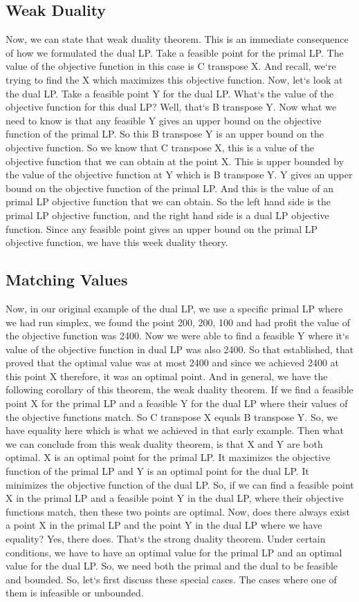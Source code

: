 \subsection{Weak Duality}
Now, we can state that weak duality theorem.
This is an immediate consequence of how we formulated the dual LP\@.
Take a feasible point for the primal LP\@.
The value of the objective function in this case is C transpose X\@.
And recall, we`re trying to find the X which maximizes this objective function.
Now, let`s look at the dual LP\@.
Take a feasible point Y for the dual LP\@.
What`s the value of the objective function for this dual LP? Well, that`s B transpose Y\@.
Now what we need to know is that any feasible Y gives an upper bound on the objective function of the primal LP\@.
So this B transpose Y is an upper bound on the objective function.
So we know that C transpose X, this is a value of the objective function that we can obtain at the point X\@.
This is upper bounded by the value of the objective function at Y which is B transpose Y\@.
Y gives an upper bound on the objective function of the primal LP\@.
And this is the value of an primal LP objective function that we can obtain.
So the left hand side is the primal LP objective function, and the right hand side is a dual LP objective function.
Since any feasible point gives an upper bound on the primal LP objective function, we have this week duality theory.

\subsection{Matching Values}
Now, in our original example of the dual LP, we use a specific primal LP where we had run simplex, we found the point 200, 200, 100 and had profit the value of the objective function was 2400.
Now we were able to find a feasible Y where it`s value of the objective function in dual LP was also 2400.
So that established, that proved that the optimal value was at most 2400 and since we achieved 2400 at this point X therefore, it was an optimal point.
And in general, we have the following corollary of this theorem, the weak duality theorem.
If we find a feasible point X for the primal LP and a feasible Y for the dual LP where their values of the objective functions match.
So C transpose X equals B transpose Y\@.
So, we have equality here which is what we achieved in that early example.
Then what we can conclude from this weak duality theorem, is that X and Y are both optimal.
X is an optimal point for the primal LP\@.
It maximizes the objective function of the primal LP and Y is an optimal point for the dual LP\@.
It minimizes the objective function of the dual LP\@.
So, if we can find a feasible point X in the primal LP and a feasible point Y in the dual LP, where their objective functions match, then these two points are optimal.
Now, does there always exist a point X in the primal LP and the point Y in the dual LP where we have equality? Yes, there does.
That`s the strong duality theorem.
Under certain conditions, we have to have an optimal value for the primal LP and an optimal value for the dual LP\@.
So, we need both the primal and the dual to be feasible and bounded.
So, let`s first discuss these special cases.
The cases where one of them is infeasible or unbounded.

